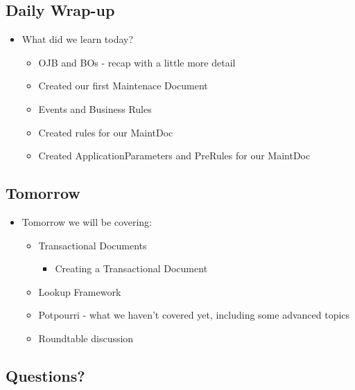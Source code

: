 \documentclass[12pt,notitlepage]{article}
\begin{document}
\begin{s5presentation}
\begin{ifhtml}
\begin{s5slide}
        \section{Daily Wrap-up}
        \begin{itemize}
            \item What did we learn today?
            \begin{itemize}
                \item OJB and BOs - recap with a little more detail
                \item Created our first Maintenace Document
                \item Events and Business Rules
                \item Created rules for our MaintDoc
                \item Created ApplicationParameters and PreRules for our MaintDoc
            \end{itemize}
        \end{itemize}
    \end{s5slide}
    \begin{s5slide}
        \section{Tomorrow}
            \begin{itemize}
                \item Tomorrow we will be covering:
                \begin{itemize}
                    \item Transactional Documents
                    \begin{itemize}
                        \item Creating a Transactional Document
                    \end{itemize}
                    \item Lookup Framework
                    \item Potpourri - what we haven't covered yet, including some advanced topics
                    \item Roundtable discussion
                \end{itemize}
            \end{itemize}
    \end{s5slide}
    \begin{s5slide}
        \section{Questions?}
            
    \end{s5slide}
    
\end{ifhtml}
    \W \end{s5presentation}
\end{document}
